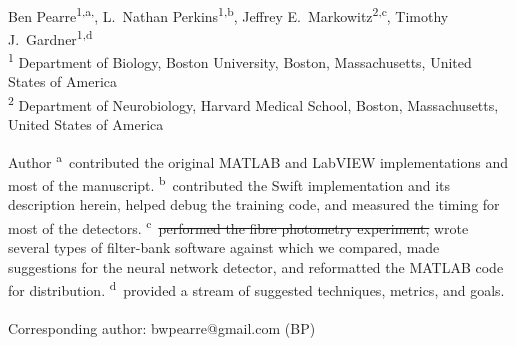 \documentclass[10pt,letterpaper]{article}
\date{}
\providecommand{\DIFdeltex}[1]{{\protect\color{red}\sout{#1}}}                      %
\providecommand{\DIFdelbegin}{} %
\providecommand{\DIFdelend}{} %
\providecommand{\DIFdel}[1]{\texorpdfstring{\DIFdeltex{#1}}{}} %
\begin{document}
\vspace*{0.35in}

\begin{flushleft}
{\Large
\textbf{}
}
\newline
\\
Ben Pearre\textsuperscript{1,a,\textcurrency},
L.~Nathan Perkins\textsuperscript{1,b},
Jeffrey E.~Markowitz\textsuperscript{2,c},
Timothy J.~Gardner\textsuperscript{1,d}
\\
\bigskip
\textsuperscript{1} Department of Biology, Boston University, Boston, Massachusetts, United States of America\\
\textsuperscript{2} Department of Neurobiology, Harvard Medical School, Boston, Massachusetts, United States of America
\\
\bigskip

% 
%
Author \textsuperscript{a}~contributed the original MATLAB and LabVIEW implementations and most of the manuscript.
\textsuperscript{b}~contributed the Swift implementation and its description herein, helped debug the training code, and measured the timing for most of the detectors.
\textsuperscript{c}~\DIFdelbegin \DIFdel{performed the fibre photometry experiment, }\DIFdelend wrote several types of filter-bank software against which we compared, made suggestions for the neural network detector, and reformatted the MATLAB code for distribution.
\textsuperscript{d}~provided a stream of suggested techniques, metrics, and goals.





\textsuperscript{\textcurrency} Corresponding author: bwpearre@gmail.com (BP)

\end{flushleft}
\end{document}
